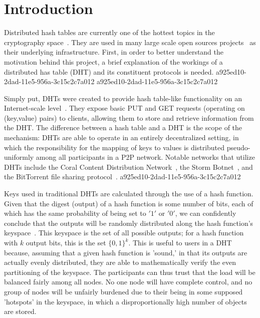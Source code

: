 \documentclass[12pt]{article}
\begin{document}
\section{Introduction}
\par Distributed hash tables are currently one of the hottest topics in the cryptography space~\cite{Stoica:2001dj,Rowstron:2001ea,Ratnasamy:2001wn}. They are used in many large scale open sources projects~\cite{Freitas:2013tb,Xu:2010vs,Perfitt:2010fh} as their underlying infrastructure. First, in order to better understand the motivation behind this project, a brief explanation of the workings of a distributed has table (DHT) and its constituent protocols is needed.
a925ed10-2dad-11e5-956a-3c15c2c7a012
a925ed10-2dad-11e5-956a-3c15c2c7a012\par Simply put, DHTs were created to provide hash table-like functionality on an Internet-scale level~\cite{Ratnasamy:2001wn}. They expose basic PUT and GET requests (operating on (key,value) pairs) to clients, allowing them to store and retrieve information from the DHT. The difference between a hash table and a DHT is the scope of the mechanism: DHTs are able to operate in an entirely decentralized setting, in which the responsibility for the mapping of keys to values is distributed pseudo-uniformly among all participants in a P2P network. Notable networks that utilize DHTs include the Coral Content Distribution Network~\cite{Freedman:2004vb}, the Storm Botnet~\cite{Holz:2008uk}, and the BitTorrent file sharing protocol~\cite{Cohen:y1_8mBnw}.
a925ed10-2dad-11e5-956a-3c15c2c7a012
\par Keys used in traditional DHTs are calculated through the use of a hash function. Given that the digest (output) of a hash function is some number of bits, each of which has the same probability of being set to $'1'$ or $'0'$, we can confidently conclude that the outputs will be randomly distributed along the hash function's keyspace~. This keyspace is the set of all possible outputs; for a hash function with $k$ output bits, this is the set $\{0,1\}^k$. This is useful to users in a DHT because, assuming that a given hash function is 'sound,' in that its outputs are actually evenly distributed, they are able to mathematically verify the even partitioning of the keyspace. The participants can thus trust that the load will be balanced fairly among all nodes. No one node will have complete control, and no group of nodes will be unfairly burdened due to their being in some supposed 'hotspots' in the keyspace, in which a disproportionally high number of objects are stored.~
\end{document}
